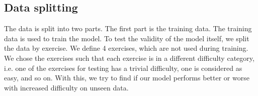 \subsection{Data splitting}

The data is split into two parts. The first part is the training data. The training data is used to train the model. To test the validity of the model itself, we split the data by exercise. We define 4 exercises, which are not used during training. We chose the exercises such that each exercise is in a different difficulty category, i.e. one of the exercises for testing has a trivial difficulty, one is considered as easy, and so on. With this, we try to find if our model performs better or worse with increased difficulty on unseen data.
